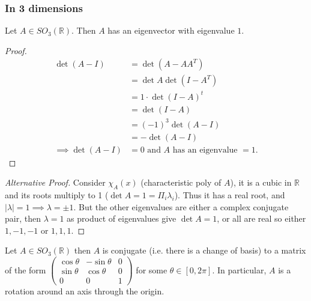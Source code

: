 \subsubsection{In 3 dimensions}
\begin{proposition}\label{prp:11}
    Let $A \in SO_3(\mathbb{R})$.
    Then $A$ has an eigenvector with eigenvalue $1$.
\end{proposition} 

\begin{proof}
    \begin{align*}
        \det (A - I) &= \det  (A - A A^T) \\
        &= \det A \det (I - A^T) \\
        &= 1 \cdot \det (I - A)^t \\
        &= \det (I - A) \\
        &= (-1)^3 \det (A - I) \\
        &= - \det (A - I) \\
        \implies \det (A - I) &= 0 \text{ and $A$ has an eigenvalue $= 1$}.
    \end{align*} 
\end{proof} 

\begin{proof}[Alternative Proof]
    Consider $\chi_A(x)$ (characteristic poly of $A$), it is a cubic in $\mathbb{R}$ and its roots multiply to 1 ($\det A = 1 = \Pi_i \lambda_i$).
    Thus it has a real root, and $|\lambda| = 1 \implies \lambda = \pm 1$. 
    But the other eigenvalues are either a complex conjugate pair, then $\lambda = 1$ as product of eigenvalues give $\det A = 1$, or all are real so either $1, -1, -1$ or $1, 1, 1$.
\end{proof} 

\begin{theorem} \label{thm:11}
    Let $A \in SO_3(\mathbb{R})$ then $A$ is conjugate (i.e. there is a change of basis) to a matrix of the form $\begin{pmatrix}
    \cos \theta & -\sin \theta & 0 \\
    \sin \theta & \cos \theta & 0 \\
    0 & 0 & 1
    \end{pmatrix}$ for some $\theta \in [0, 2 \pi]$.
    In particular, $A$ is a rotation around an axis through the origin.
\end{theorem} 

